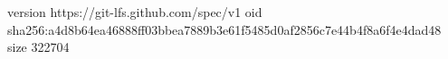 version https://git-lfs.github.com/spec/v1
oid sha256:a4d8b64ea46888ff03bbea7889b3e61f5485d0af2856c7e44b4f8a6f4e4dad48
size 322704
